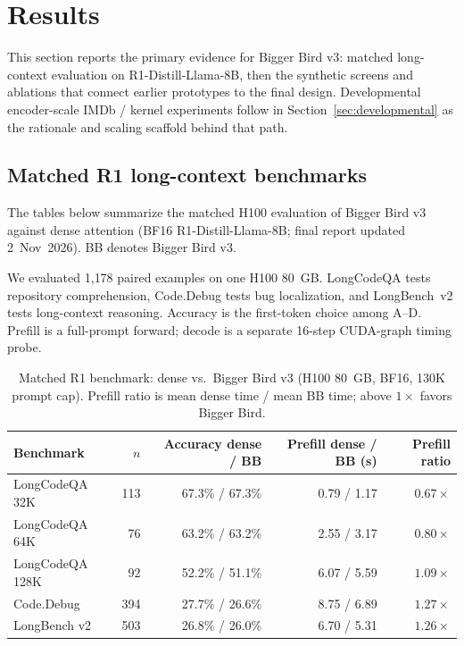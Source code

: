 \documentclass[11pt]{article}
\begin{document}
\section{Results}
\label{sec:results}
\label{sec:r1-benchmark}

This section reports the primary evidence for Bigger Bird v3: matched
long-context evaluation on R1-Distill-Llama-8B, then the synthetic screens and
ablations that connect earlier prototypes to the final design. Developmental
encoder-scale IMDb / kernel experiments follow in
Section~\ref{sec:developmental} as the rationale and scaling scaffold behind
that path.

\subsection{Matched R1 long-context benchmarks}

The tables below summarize the matched H100 evaluation of Bigger Bird v3
against dense attention (BF16 R1-Distill-Llama-8B; final report updated
2~Nov~2026). BB denotes Bigger Bird v3.


We evaluated 1{,}178 paired examples on one H100 80~GB. LongCodeQA tests
repository comprehension, Code.Debug tests bug localization, and LongBench~v2
tests long-context reasoning. Accuracy is the first-token choice among A--D.
Prefill is a full-prompt forward; decode is a separate 16-step CUDA-graph
timing probe.

\begin{table}[ht]
  \centering
  \small
  \caption{Matched R1 benchmark: dense vs.\ Bigger Bird v3 (H100 80~GB, BF16,
  130K prompt cap). Prefill ratio is mean dense time / mean BB time; above
  $1\times$ favors Bigger Bird.}
  \label{tab:r1-benchmark}
  \begin{tabular}{@{}lrrrr@{}}
    \toprule
    Benchmark & $n$ & Accuracy dense / BB & Prefill dense / BB (s) & Prefill ratio \\
    \midrule
    LongCodeQA 32K  & 113 & 67.3\% / 67.3\% & 0.79 / 1.17 & $0.67\times$ \\
    LongCodeQA 64K  & 76  & 63.2\% / 63.2\% & 2.55 / 3.17 & $0.80\times$ \\
    LongCodeQA 128K & 92  & 52.2\% / 51.1\% & 6.07 / 5.59 & $1.09\times$ \\
    Code.Debug      & 394 & 27.7\% / 26.6\% & 8.75 / 6.89 & $1.27\times$ \\
    LongBench v2    & 503 & 26.8\% / 26.0\% & 6.70 / 5.31 & $1.26\times$ \\
    \bottomrule
  \end{tabular}
\end{table}
\end{document}
